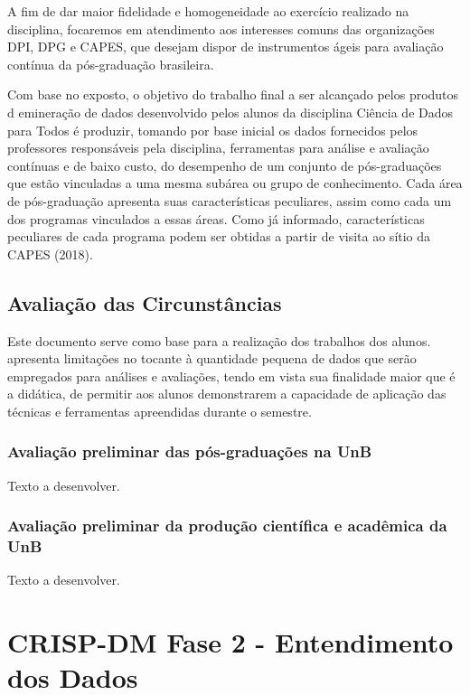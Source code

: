 \documentclass[]{article}
\begin{document}
A fim de dar maior fidelidade e homogeneidade ao exercício realizado na
disciplina, focaremos em atendimento aos interesses comuns das
organizações DPI, DPG e CAPES, que desejam dispor de instrumentos ágeis
para avaliação contínua da pós-graduação brasileira.

Com base no exposto, o objetivo do trabalho final a ser alcançado pelos
produtos d emineração de dados desenvolvido pelos alunos da disciplina
Ciência de Dados para Todos é produzir, tomando por base inicial os
dados fornecidos pelos professores responsáveis pela disciplina,
ferramentas para análise e avaliação contínuas e de baixo custo, do
desempenho de um conjunto de pós-graduações que estão vinculadas a uma
mesma subárea ou grupo de conhecimento. Cada área de pós-graduação
apresenta suas características peculiares, assim como cada um dos
programas vinculados a essas áreas. Como já informado, características
peculiares de cada programa podem ser obtidas a partir de visita ao
sítio da CAPES (2018).

\subsection{Avaliação das
Circunstâncias}\label{avaliacao-das-circunstancias}

Este documento serve como base para a realização dos trabalhos dos
alunos. apresenta limitações no tocante à quantidade pequena de dados
que serão empregados para análises e avaliações, tendo em vista sua
finalidade maior que é a didática, de permitir aos alunos demonstrarem a
capacidade de aplicação das técnicas e ferramentas apreendidas durante o
semestre.

\subsubsection{Avaliação preliminar das pós-graduações na
UnB}\label{avaliacao-preliminar-das-pos-graduacoes-na-unb}

Texto a desenvolver.

\subsubsection{Avaliação preliminar da produção científica e acadêmica
da
UnB}\label{avaliacao-preliminar-da-producao-cientifica-e-academica-da-unb}

Texto a desenvolver.

\section{CRISP-DM Fase 2 - Entendimento dos
Dados}\label{crisp-dm-fase-2---entendimento-dos-dados}
\end{document}
